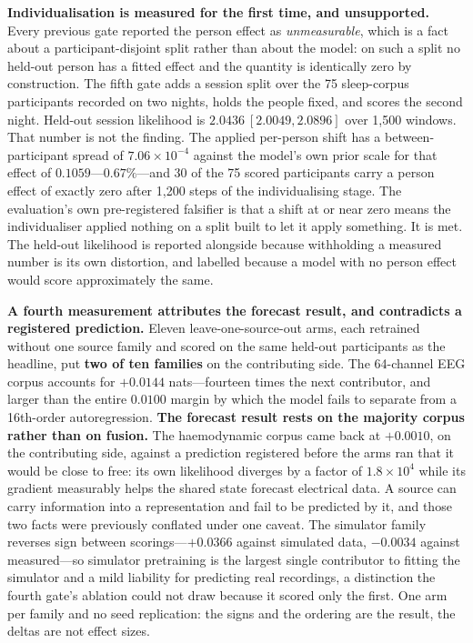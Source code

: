 \textbf{Individualisation is measured for the first time, and unsupported.} Every
previous gate reported the person effect as \emph{unmeasurable}, which is a fact
about a participant-disjoint split rather than about the model: on such a split
no held-out person has a fitted effect and the quantity is identically zero by
construction. The fifth gate adds a session split over the 75 sleep-corpus
participants recorded on two nights, holds the people fixed, and scores the
second night. Held-out session likelihood is \(2.0436\ [2.0049, 2.0896]\) over
1{,}500 windows. That number is not the finding. The applied per-person shift has
a between-participant spread of \(7.06\times10^{-4}\) against the model's own
prior scale for that effect of \(0.1059\)---\(0.67\%\)---and 30 of the 75 scored
participants carry a person effect of exactly zero after 1{,}200 steps of the
individualising stage. The evaluation's own pre-registered falsifier is that a
shift at or near zero means the individualiser applied nothing on a split built
to let it apply something. It is met. The held-out likelihood is reported
alongside because withholding a measured number is its own distortion, and
labelled because a model with no person effect would score approximately the
same.

\textbf{A fourth measurement attributes the forecast result, and contradicts a
registered prediction.} Eleven leave-one-source-out arms, each retrained without
one source family and scored on the same held-out participants as the headline,
put \textbf{two of ten families} on the contributing side. The 64-channel EEG
corpus accounts for \(+0.0144\) nats---fourteen times the next contributor, and
larger than the entire \(0.0100\) margin by which the model fails to separate
from a 16th-order autoregression. \textbf{The forecast result rests on the
majority corpus rather than on fusion.} The haemodynamic corpus came back at
\(+0.0010\), on the contributing side, against a prediction registered before the
arms ran that it would be close to free: its own likelihood diverges by a factor
of \(1.8\times10^{4}\) while its gradient measurably helps the shared state
forecast electrical data. A source can carry information into a representation
and fail to be predicted by it, and those two facts were previously conflated
under one caveat. The simulator family reverses sign between scorings---\(+0.0366\)
against simulated data, \(-0.0034\) against measured---so simulator pretraining is
the largest single contributor to fitting the simulator and a mild liability for
predicting real recordings, a distinction the fourth gate's ablation could not
draw because it scored only the first. One arm per family and no seed
replication: the signs and the ordering are the result, the deltas are not effect
sizes.

